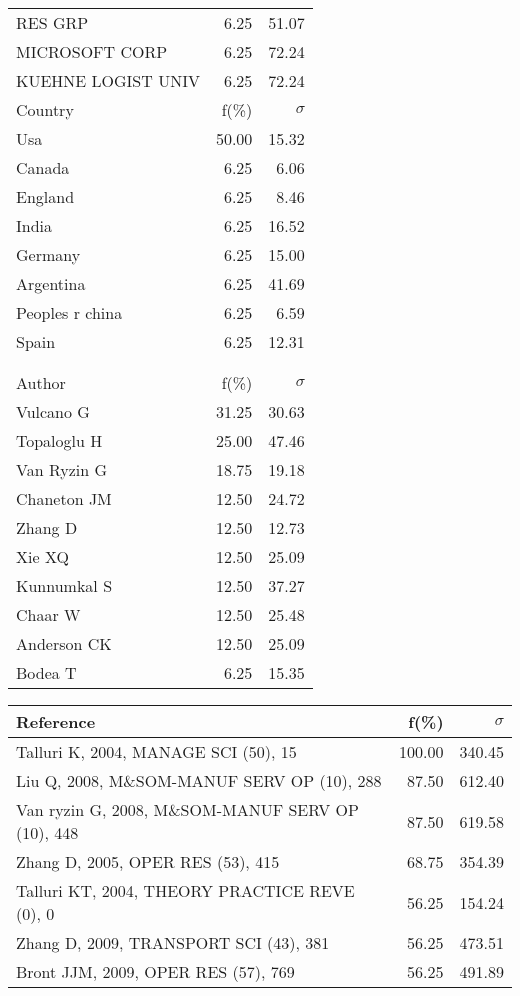 \documentclass[a4paper,11pt]{report}
\begin{document}
\begin{landscape}
\begin{table}[!ht]
{\begin{tabular}{|l r r|}
RES GRP & 6.25 & 51.07\\
MICROSOFT CORP & 6.25 & 72.24\\
KUEHNE LOGIST UNIV & 6.25 & 72.24\\
\hline
\hline
Country & f(\%) & $\sigma$\\
\hline
Usa & 50.00 & 15.32\\
Canada & 6.25 & 6.06\\
England & 6.25 & 8.46\\
India & 6.25 & 16.52\\
Germany & 6.25 & 15.00\\
Argentina & 6.25 & 41.69\\
Peoples r china & 6.25 & 6.59\\
Spain & 6.25 & 12.31\\
 &  & \\
 &  & \\
\hline
\hline
Author & f(\%) & $\sigma$\\
\hline
Vulcano G & 31.25 & 30.63\\
Topaloglu H & 25.00 & 47.46\\
Van Ryzin G & 18.75 & 19.18\\
Chaneton JM & 12.50 & 24.72\\
Zhang D & 12.50 & 12.73\\
Xie XQ & 12.50 & 25.09\\
Kunnumkal S & 12.50 & 37.27\\
Chaar W & 12.50 & 25.48\\
Anderson CK & 12.50 & 25.09\\
Bodea T & 6.25 & 15.35\\
\hline
\end{tabular}
}
{\scriptsize\begin{tabular}{|l r r|}
\hline
Reference & f(\%) & $\sigma$\\
\hline
Talluri K, 2004, MANAGE SCI (50), 15 & 100.00 & 340.45\\
Liu Q, 2008, M\&SOM-MANUF SERV OP (10), 288 & 87.50 & 612.40\\
Van ryzin G, 2008, M\&SOM-MANUF SERV OP (10), 448 & 87.50 & 619.58\\
Zhang D, 2005, OPER RES (53), 415 & 68.75 & 354.39\\
Talluri KT, 2004, THEORY PRACTICE REVE (0), 0 & 56.25 & 154.24\\
Zhang D, 2009, TRANSPORT SCI (43), 381 & 56.25 & 473.51\\
Bront JJM, 2009, OPER RES (57), 769 & 56.25 & 491.89\\

\end{tabular}}
\end{table}
\end{landscape}
\end{document}
